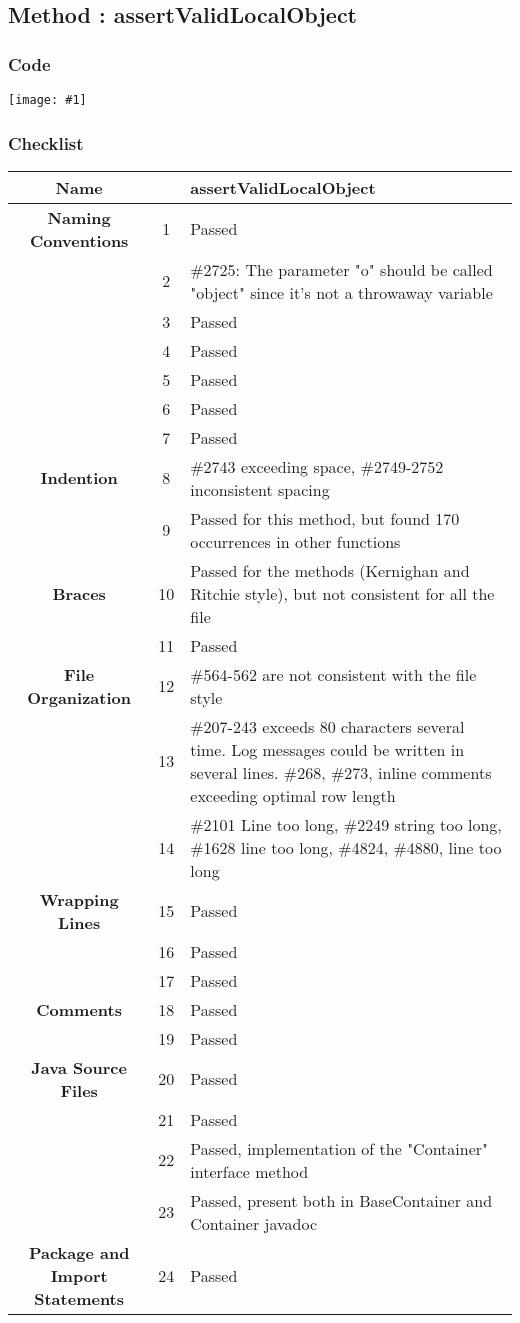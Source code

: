 \documentclass[11pt, a4paper,titlepage]{article}
\newcommand{\image}[1]{
	\begin{center}
		\noindent \texttt{[image: \#1]}
	\end{center}
	}
\begin{document}
\newpage
\subsection{Method : assertValidLocalObject }
\subsubsection{Code}
\image{code_5.png}
\newpage
\subsubsection{Checklist}
  \begin{tabularx}{\textwidth}{| c |c |X |}
  	\hline \textbf{Name} & & assertValidLocalObject \\
  	\hline \textbf{Naming Conventions} & 1  & Passed  \\
  	\hline  & 2 & \#2725: The parameter "o" should be called "object" since it's not a throwaway variable \\
  	\hline  & 3 & Passed \\
  	\hline  & 4 & Passed \\
  	\hline  & 5 & Passed \\
  	\hline  & 6 & Passed \\
  	\hline  & 7 & Passed \\
  	\hline \textbf{Indention} & 8 & \#2743 exceeding space, \#2749-2752 inconsistent spacing \\
  	\hline  & 9 & Passed for this method, but found 170 occurrences in other functions \\
  	\hline \textbf{Braces} & 10 & Passed for the methods (Kernighan and Ritchie style), but not consistent for all the file \\
  	\hline  & 11 & Passed \\
  	\hline \textbf{File Organization} & 12 & \#564-562 are not consistent with the file style \\
  	\hline  & 13 & \#207-243 exceeds 80 characters several time. Log messages could be written in several lines.
  	\#268, \#273, inline comments exceeding optimal row length
  	\\
  	\hline  & 14 & \#2101 Line too long, \#2249 string too long, \#1628 line too long, \#4824, \#4880, line too long \\
  	\hline \textbf{Wrapping Lines} & 15 & Passed \\
  	\hline  & 16 & Passed \\
  	\hline  & 17 & Passed \\
  	\hline \textbf{Comments} & 18 & Passed \\
  	\hline  & 19 & Passed \\
  	\hline \textbf{Java Source Files} & 20 & Passed \\
  	\hline  & 21 & Passed \\
  	\hline  & 22 & Passed, implementation of the "Container" interface method \\ 
  	\hline  & 23 & Passed, present both in BaseContainer and Container javadoc \\
  	\hline \textbf{Package and Import Statements} & 24 & Passed \\
  	\hline
  \end{tabularx}
\end{document}

